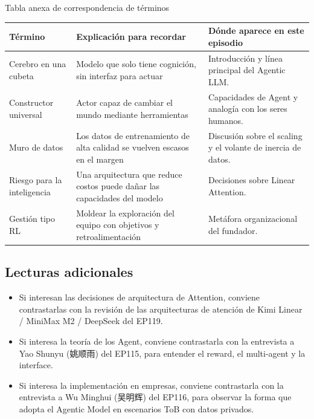 \begin{knowledgebox}{Tabla anexa de correspondencia de términos}
\begin{tabularx}{\textwidth}{p{}p{}X}
\toprule
Término & Explicación para recordar & Dónde aparece en este episodio \\
\midrule
Cerebro en una cubeta & Modelo que solo tiene cognición, sin interfaz para actuar & Introducción y línea principal del Agentic LLM. \\
Constructor universal & Actor capaz de cambiar el mundo mediante herramientas & Capacidades de Agent y analogía con los seres humanos. \\
Muro de datos & Los datos de entrenamiento de alta calidad se vuelven escasos en el margen & Discusión sobre el scaling y el volante de inercia de datos. \\
Riesgo para la inteligencia & Una arquitectura que reduce costos puede dañar las capacidades del modelo & Decisiones sobre Linear Attention. \\
Gestión tipo RL & Moldear la exploración del equipo con objetivos y retroalimentación & Metáfora organizacional del fundador. \\
\bottomrule
\end{tabularx}
\end{knowledgebox}

\subsection{Lecturas adicionales}

\begin{itemize}
\item Si interesan las decisiones de arquitectura de Attention, conviene contrastarlas con la revisión de las arquitecturas de atención de Kimi Linear / MiniMax M2 / DeepSeek del EP119.
\item Si interesa la teoría de los Agent, conviene contrastarla con la entrevista a Yao Shunyu (姚顺雨) del EP115, para entender el reward, el multi-agent y la interface.
\item Si interesa la implementación en empresas, conviene contrastarla con la entrevista a Wu Minghui (吴明辉) del EP116, para observar la forma que adopta el Agentic Model en escenarios ToB con datos privados.
\end{itemize}


